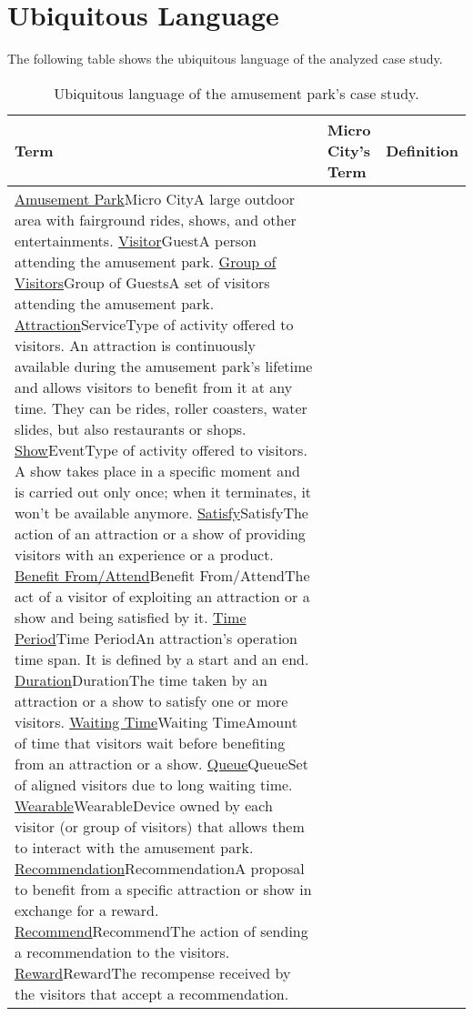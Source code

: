 \section{Ubiquitous Language}
\label{sec:ubiquitous-language}

The following table shows the ubiquitous language of the analyzed case study.

\begin{longtable}{|l|l|p{}|}
    \hline
    \textbf{Term} & \textbf{Micro City's Term} & \textbf{Definition}\\
    \hline
    \ul{Amusement Park}{Micro City}{A large outdoor area with fairground rides, shows, and other entertainments.}
    \ul{Visitor}{Guest}{A person attending the amusement park.}
    \ul{Group of Visitors}{Group of Guests}{A set of visitors attending the amusement park.}
    \ul{Attraction}{Service}{Type of activity offered to visitors. An attraction is continuously available during the amusement park's lifetime and allows visitors to benefit from it at any time. They can be rides, roller coasters, water slides, but also restaurants or shops.}
    \ul{Show}{Event}{Type of activity offered to visitors. A show takes place in a specific moment and is carried out only once; when it terminates, it won't be available anymore.}
    \ul{Satisfy}{Satisfy}{The action of an attraction or a show of providing visitors with an experience or a product.}
    \ul{Benefit From/Attend}{Benefit From/Attend}{The act of a visitor of exploiting an attraction or a show and being satisfied by it.}
    \ul{Time Period}{Time Period}{An attraction's operation time span. It is defined by a start and an end.}
    \ul{Duration}{Duration}{The time taken by an attraction or a show to satisfy one or more visitors.}
    \ul{Waiting Time}{Waiting Time}{Amount of time that visitors wait before benefiting from an attraction or a show.}
    \ul{Queue}{Queue}{Set of aligned visitors due to long waiting time.}
    \ul{Wearable}{Wearable}{Device owned by each visitor (or group of visitors) that allows them to interact with the amusement park.}
    \ul{Recommendation}{Recommendation}{A proposal to benefit from a specific attraction or show in exchange for a reward.}
    \ul{Recommend}{Recommend}{The action of sending a recommendation to the visitors.}
    \ul{Reward}{Reward}{The recompense received by the visitors that accept a recommendation.}
    \caption{Ubiquitous language of the amusement park's case study.}
    \label{tab:ul}
\end{longtable}
